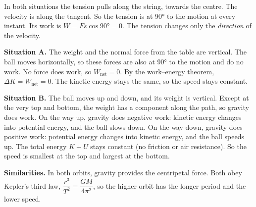 \begin{practiceanswers}
\begin{practiceans}
  \begin{modelanswer}
  In both situations the tension pulls along the string, towards the centre. The velocity is
  along the tangent. So the tension is at \ang{90} to the motion at every instant. Its work is
  $W = Fs\cos\ang{90} = 0$. The tension changes only the \emph{direction} of the velocity.

  \textbf{Situation A.} The weight and the normal force from the table are vertical. The ball
  moves horizontally, so these forces are also at \ang{90} to the motion and do no work. No
  force does work, so $W_\mathrm{net} = 0$. By the work--energy theorem,
  $\Delta K = W_\mathrm{net} = 0$. The kinetic energy stays the same, so the speed stays
  constant.

  \textbf{Situation B.} The ball moves up and down, and its weight is vertical. Except at the
  very top and bottom, the weight has a component along the path, so gravity does work. On the
  way up, gravity does negative work: kinetic energy changes into potential energy, and the
  ball slows down. On the way down, gravity does positive work: potential energy changes into
  kinetic energy, and the ball speeds up. The total energy $K + U$ stays constant (no friction
  or air resistance). So the speed is smallest at the top and largest at the bottom.
  \end{modelanswer}
  \begin{markingcriteria}
  \end{markingcriteria}
\end{practiceans}

\begin{practiceans}
  \begin{modelanswer}
  \textbf{Similarities.} In both orbits, gravity provides the centripetal force. Both obey
  Kepler's third law, $\dfrac{r^3}{T^2} = \dfrac{GM}{4\pi^2}$, so the higher orbit has the
  longer period and the lower speed.


\end{modelanswer}
\end{practiceans}
\end{practiceanswers}
